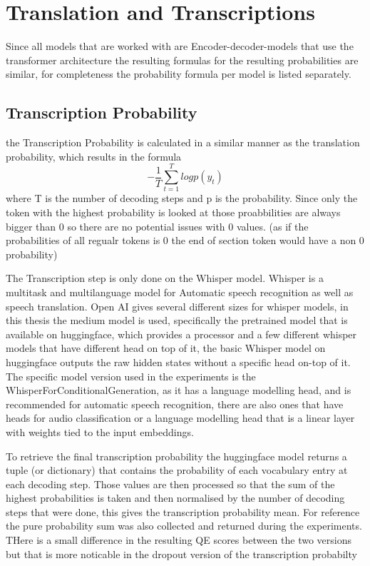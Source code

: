 \section{Translation and Transcriptions}
Since all models that are worked with are Encoder-decoder-models that use the transformer architecture the resulting formulas for the resulting probabilities are similar, for completeness the probability formula per model is listed separately. 

\subsection{Transcription Probability}
the Transcription Probability is calculated in a similar manner as the translation probability, which results in the formula $$-\frac{1}{T}\sum_{t=1}^T log p(y_t)$$ where T is the number of decoding steps and p is the probability.
Since only the token with the highest probability is looked at those proabbilities are always bigger than 0 so there are no potential issues with 0 values. (as if the probabilities of all regualr tokens is 0 the end of section token would have a non 0 probability)

The Transcription step is only done on the Whisper model.
Whisper \cite{radford2022robust} is a multitask and multilanguage model for Automatic speech recognition as well as speech translation. 
Open AI gives several different sizes for whisper models, in this thesis the medium model is used, specifically the pretrained model that is available on huggingface, which provides a processor and a few different whisper models that have different head on top of it, the basic Whisper model on huggingface outputs the raw hidden states without a specific head on-top of it. 
The specific model version used in the experiments is the WhisperForConditionalGeneration, as it has a language modelling head, and is recommended for automatic speech recognition, there are also ones that have heads for audio classification or a language modelling head that is a linear layer with weights tied to the input embeddings. 

To retrieve the final transcription probability the huggingface model returns a tuple (or dictionary) that contains the probability of each vocabulary entry at each decoding step.
Those values are then processed so that the sum of the highest probabilities is taken and then normalised by the number of decoding steps that were done, this gives the transcription probability mean. For reference the pure probability sum was also collected and returned during the experiments. 
THere is a small difference in the resulting QE scores between the two versions but that is more noticable in the dropout version of the transcription probabilty 

